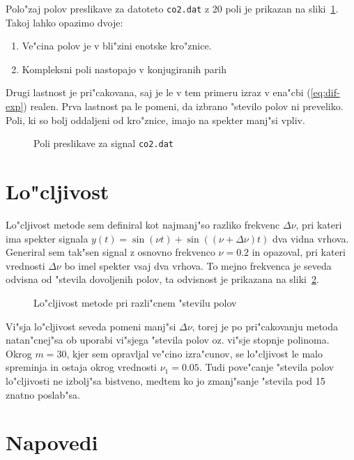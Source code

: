 \documentclass[a4paper,10pt]{article}
\begin{document}
Polo"zaj polov preslikave za datoteto \texttt{co2.dat} z 20 poli je prikazan na sliki~\ref{fig:roots-co2}. Takoj lahko opazimo dvoje:

\begin{enumerate}
 \item Ve"cina polov je v bli"zini enotske kro"znice.
 \item Kompleksni poli nastopajo v konjugiranih parih
\end{enumerate}

Drugi lastnost je pri"cakovana, saj je le v tem primeru izraz v ena"cbi (\ref{eq:dif-exp}) realen. Prva lastnost pa le pomeni, da izbrano "stevilo polov ni preveliko. Poli, ki so bolj oddaljeni od kro"znice, imajo na spekter manj"si vpliv. 


\begin{figure}[H]
 \centering
 \caption{Poli preslikave za signal \texttt{co2.dat}}
 \label{fig:roots-co2}
\end{figure}


\section{Lo"cljivost}

Lo"cljivost metode sem definiral kot najmanj"so razliko frekvenc $\Delta\nu$, pri kateri ima spekter signala $y(t) = \sin(\nu t) + \sin((\nu + \Delta \nu)t)$ dva vidna vrhova. Generiral sem tak"sen signal z osnovno frekvenco $\nu = 0.2$ in opazoval, pri kateri vrednosti $\Delta\nu$ bo imel spekter vsaj dva vrhova. To mejno frekvenca je seveda odvisna od "stevila dovoljenih polov, ta odvisnost je prikazana na sliki~\ref{fig:loc}. 

\begin{figure}[H]
 \centering
 \caption{Lo"cljivost metode pri razli"cnem "stevilu polov}
 \label{fig:loc}
\end{figure}

Vi"sja lo"cljivost seveda pomeni manj"si $\Delta \nu$, torej je po pri"cakovanju metoda natan"cnej"sa ob uporabi vi"sjega "stevila polov oz. vi"sje stopnje polinoma. Okrog $m=30$, kjer sem opravljal ve"cino izra"cunov, se lo"cljivost le malo spreminja in ostaja okrog vrednosti $\nu_1 = 0.05$. Tudi pove"canje "stevila polov lo"cljivosti ne izbolj"sa bistveno, medtem ko jo zmanj"sanje "stevila pod 15 znatno poslab"sa. 

\section{Napovedi}
\end{document}
